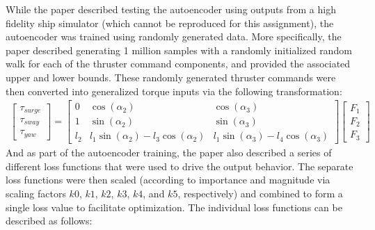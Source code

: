 \documentclass{article}
\begin{document}
While the paper described testing the autoencoder using outputs from a high fidelity ship simulator (which cannot be reproduced for this assignment), the autoencoder was trained using randomly generated data. More specifically, the paper described generating 1 million samples with a randomly initialized random walk for each of the thruster command components, and provided the associated upper and lower bounds. These randomly generated thruster commands were then converted into generalized torque inputs via the following transformation:
\begin{gather*}
    \begin{bmatrix}
        \tau_{surge} \\
        \tau_{sway} \\
        \tau_{yaw}
    \end{bmatrix}
    =
    \begin{bmatrix}
        0 & \cos \left(\alpha_2\right) & \cos \left(\alpha_3\right) \\ 
        1 & \sin \left(\alpha_2\right) & \sin \left(\alpha_3\right) \\
        l_2 & l_1 \sin \left(\alpha_2\right) - l_3 \cos \left(\alpha_2\right) & l_1 \sin \left(\alpha_3\right) - l_4\cos\left(\alpha_3\right)
    \end{bmatrix}
    \dot{}
    \begin{bmatrix}
        F_1 \\
        F_2 \\
        F_3 
    \end{bmatrix}
\end{gather*}
And as part of the autoencoder training, the paper also described a series of different loss functions that were used to drive the output behavior. The separate loss functions were then scaled (according to importance and magnitude via scaling factors $k0$, $k1$, $k2$, $k3$, $k4$, and $k5$, respectively) and combined to form a single loss value to facilitate optimization. The individual loss functions can be described as follows:
\end{document}
